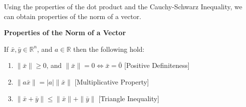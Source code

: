 Using the properties of the dot product and the Cauchy-Schwarz Inequality, we can obtain properties of the norm of a vector.

\begin{theorembox}

\textbf{Properties of the Norm of a Vector}

If $\bar{x}, \bar{y} \in \mathbb{R}^n$, and $a \in \mathbb{R}$ then the following hold:

\begin{enumerate}

\item $\|\bar{x}\| \geq 0$, and $\|\bar{x}\| = 0 \Leftrightarrow \bar{x} = \bar{0}$ \hfill [Positive Definiteness]
\item $\|a\bar{x}\| = |a|\|\bar{x}\|$ \hfill [Multiplicative Property]
\item $\|\bar{x} + \bar{y}\| \leq \|\bar{x}\| + \|\bar{y}\|$ \hfill [Triangle Inequality]

\end{enumerate}
\end{theorembox}


